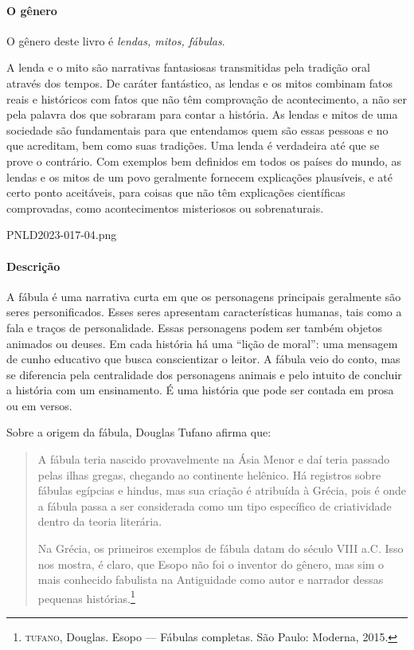 \documentclass[11pt]{extarticle}
\begin{document}
\paragraph{O gênero} O gênero deste livro é \textit{lendas, mitos, fábulas}.

A lenda e o mito são narrativas fantasiosas transmitidas pela tradição oral através dos tempos. De caráter fantástico, as lendas e os mitos combinam fatos reais e históricos com fatos que não têm comprovação de acontecimento, a não ser pela palavra dos que sobraram para contar a história. As lendas e mitos de uma sociedade são fundamentais para que entendamos quem são essas pessoas e no que acreditam, bem como suas tradições. Uma lenda é verdadeira até que se prove o contrário. Com exemplos bem definidos em todos os países do mundo, as lendas e os mitos de um povo geralmente fornecem explicações plausíveis, e até certo ponto aceitáveis, para coisas que não têm explicações científicas comprovadas, como acontecimentos misteriosos ou sobrenaturais.

 {PNLD2023-017-04.png}

\paragraph{Descrição} A fábula é uma narrativa curta em que os personagens principais geralmente são seres personificados. Esses seres apresentam características humanas, tais como a fala e traços de personalidade. Essas personagens podem ser também objetos animados ou deuses. Em cada história há uma ``lição de moral'': uma mensagem de cunho educativo que busca conscientizar o leitor. A fábula veio do conto, mas se diferencia pela centralidade dos personagens animais e pelo intuito de concluir a história com um ensinamento. É uma história que pode ser contada em prosa ou em versos. 

Sobre a origem da fábula, Douglas Tufano afirma que:

\begin{quote} A fábula teria nascido provavelmente na Ásia Menor e daí teria passado pelas ilhas gregas, chegando ao continente helênico. Há registros sobre fábulas egípcias e hindus, mas sua criação é atribuída à Grécia, pois é onde a fábula passa a ser considerada como um tipo específico de criatividade dentro da teoria literária. 

Na Grécia, os primeiros exemplos de fábula datam do século VIII a.C. Isso nos mostra, é claro, que Esopo não foi o inventor do gênero, mas sim o mais conhecido fabulista na Antiguidade como autor e narrador dessas pequenas histórias.\footnote{\textsc{tufano}, Douglas. Esopo --- Fábulas completas. São Paulo: Moderna, 2015.}
\end{quote}
\end{document}
